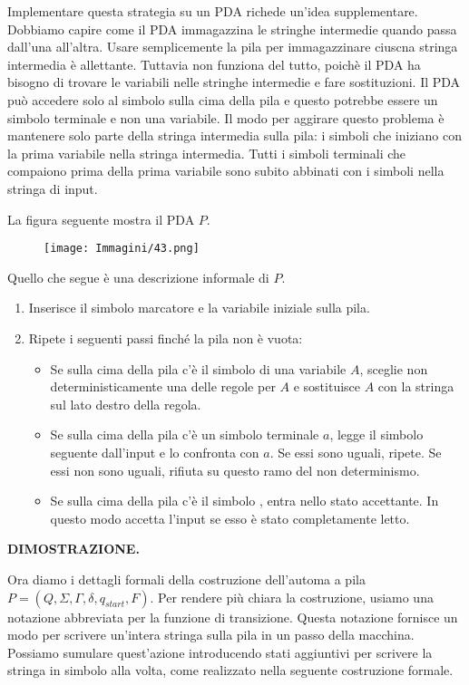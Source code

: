 \documentclass{article}
\begin{document}
Implementare questa strategia su un PDA richede un'idea supplementare.
Dobbiamo capire come il PDA immagazzina le stringhe intermedie quando passa dall'una all'altra. 
Usare semplicemente la pila per immagazzinare ciuscna stringa intermedia è allettante. 
Tuttavia non funziona del tutto, poichè il PDA ha bisogno di trovare le variabili nelle stringhe intermedie e fare sostituzioni. 
Il PDA può accedere solo al simbolo sulla cima della pila e questo potrebbe essere un simbolo terminale e non una variabile. 
Il modo per aggirare questo problema è mantenere solo parte della stringa intermedia sulla pila: i simboli che iniziano con la prima variabile nella stringa intermedia. 
Tutti i simboli terminali che compaiono prima della prima variabile sono subito abbinati con i simboli nella stringa di input.

La figura seguente mostra il PDA $P$.

\begin{figure}[H]
    \centering
    \texttt{[image: Immagini/43.png]}
    \label{fig:pda_example1}
\end{figure}

Quello che segue è una descrizione informale di $P$.
\begin{enumerate}
    \item Inserisce il simbolo marcatore \textdollar \text{ }e la variabile iniziale sulla pila.
    \item Ripete i seguenti passi finché la pila non è vuota:
    \begin{itemize}
        \item Se sulla cima della pila c'è il simbolo di una variabile $A$, sceglie non deterministicamente una delle regole per $A$ e sostituisce $A$ con la stringa sul lato destro della regola.
        \item Se sulla cima della pila c'è un simbolo terminale $a$, legge il simbolo seguente dall'input e lo confronta con $a$. Se essi sono uguali, ripete. Se essi non sono uguali, rifiuta su questo ramo del non determinismo.
        \item Se sulla cima della pila c'è il simbolo \textdollar \text{ }, entra nello stato accettante. In questo modo accetta l'input se esso è stato completamente letto.
    \end{itemize}
\end{enumerate}
\vspace{1em}
 
\textbf{DIMOSTRAZIONE.}

Ora diamo i dettagli formali della costruzione dell'automa a pila $P = (Q,\Sigma,\Gamma,\delta,q_{start},F)$. 
Per rendere più chiara la costruzione, usiamo una notazione abbreviata per la funzione di transizione.
Questa notazione fornisce un modo per scrivere un'intera stringa sulla pila in un passo della macchina. 
Possiamo sumulare quest'azione introducendo stati aggiuntivi per scrivere la stringa in simbolo alla volta, come realizzato nella seguente costruzione formale.
\end{document}
